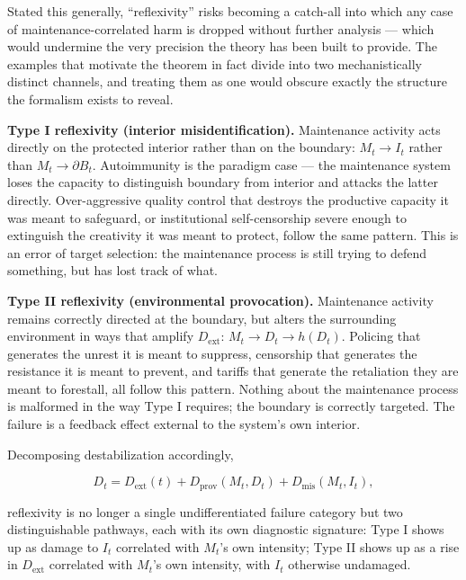 \documentclass[11pt]{article}
\theoremstyle{plain}
\begin{document}
Stated this generally, ``reflexivity'' risks becoming a catch-all into which any case of maintenance-correlated harm is dropped without further analysis --- which would undermine the very precision the theory has been built to provide. The examples that motivate the theorem in fact divide into two mechanistically distinct channels, and treating them as one would obscure exactly the structure the formalism exists to reveal.

\textbf{Type I reflexivity (interior misidentification).} Maintenance activity acts directly on the protected interior rather than on the boundary: \(M_t \to I_t\) rather than \(M_t \to \partial B_t\). Autoimmunity is the paradigm case --- the maintenance system loses the capacity to distinguish boundary from interior and attacks the latter directly. Over-aggressive quality control that destroys the productive capacity it was meant to safeguard, or institutional self-censorship severe enough to extinguish the creativity it was meant to protect, follow the same pattern. This is an error of target selection: the maintenance process is still trying to defend something, but has lost track of what.

\textbf{Type II reflexivity (environmental provocation).} Maintenance activity remains correctly directed at the boundary, but alters the surrounding environment in ways that amplify \(D_{\mathrm{ext}}\): \(M_t \to D_t \to h(D_t)\). Policing that generates the unrest it is meant to suppress, censorship that generates the resistance it is meant to prevent, and tariffs that generate the retaliation they are meant to forestall, all follow this pattern. Nothing about the maintenance process is malformed in the way Type I requires; the boundary is correctly targeted. The failure is a feedback effect external to the system's own interior.

Decomposing destabilization accordingly,

\[D_t = D_{\mathrm{ext}}(t) + D_{\mathrm{prov}}(M_t, D_t) + D_{\mathrm{mis}}(M_t, I_t),\]

reflexivity is no longer a single undifferentiated failure category but two distinguishable pathways, each with its own diagnostic signature: Type I shows up as damage to \(I_t\) correlated with \(M_t\)'s own intensity; Type II shows up as a rise in \(D_{\mathrm{ext}}\) correlated with \(M_t\)'s own intensity, with \(I_t\) otherwise undamaged.
\end{document}
